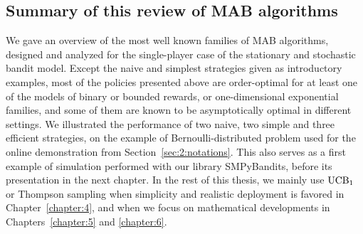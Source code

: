 %



\subsection{Summary of this review of MAB algorithms}
%
We gave an overview of the most well known families of MAB algorithms,
designed and analyzed for the single-player case of the stationary and stochastic bandit model.
Except the naive and simplest strategies given as introductory examples, most of the policies presented above are order-optimal for at least one of the models of binary or bounded rewards, or one-dimensional exponential families,
and some of them are known to be asymptotically optimal in different settings.
%
We illustrated the performance of two naive, two simple and three efficient strategies, on the example of Bernoulli-distributed problem used for the online demonstration from Section~\ref{sec:2:notations}.
This also serves as a first example of simulation performed with our library SMPyBandits, before its presentation in the next chapter.
%
In the rest of this thesis, we mainly use $\mathrm{UCB}_1$ or Thompson sampling when simplicity and realistic deployment is favored in Chapter~\ref{chapter:4}, and \klUCB{} when we focus on mathematical developments in Chapters~\ref{chapter:5} and \ref{chapter:6}.



